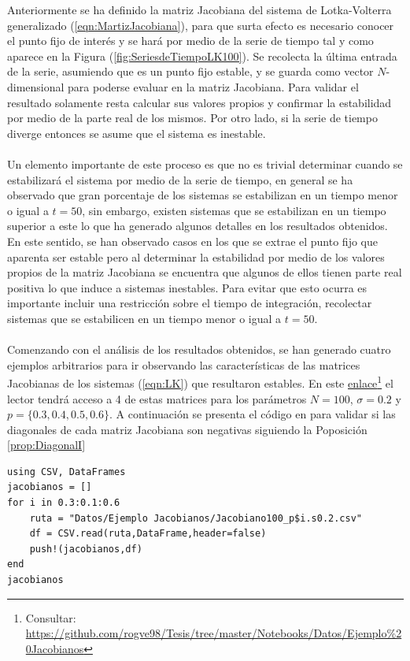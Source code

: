 Anteriormente se ha definido la matriz Jacobiana del sistema de Lotka-Volterra generalizado (\ref{eqn:MartizJacobiana}), para que surta efecto es necesario conocer el punto fijo de interés y se hará por medio de la serie de tiempo tal y como aparece en la Figura (\ref{fig:SeriesdeTiempoLK100}). Se recolecta la última entrada de la serie, asumiendo que es un punto fijo estable, y se guarda como vector $N$-dimensional para poderse evaluar en la matriz Jacobiana. Para validar el resultado solamente resta calcular sus valores propios y confirmar la estabilidad por medio de la parte real de los mismos. Por otro lado, si la serie de tiempo diverge entonces se asume que el sistema es inestable.
\\
\\
Un elemento importante de este proceso es que no es trivial determinar cuando se estabilizará el sistema por medio de la serie de tiempo, en general se ha observado que gran porcentaje de los sistemas se estabilizan en un tiempo menor o igual a $t=50$, sin embargo, existen sistemas que se estabilizan en un tiempo superior a este lo que ha generado algunos detalles en los resultados obtenidos. En este sentido, se han observado casos en los que se extrae el punto fijo que aparenta ser estable pero al determinar la estabilidad por medio de los valores propios de la matriz Jacobiana se encuentra que  algunos de ellos tienen parte real positiva lo que induce a sistemas inestables. Para evitar que esto ocurra es importante incluir una restricción sobre el tiempo de integración, recolectar sistemas que se estabilicen en un tiempo menor o igual a $t=50$.
\\
\\
Comenzando con el análisis de los resultados obtenidos, se han generado cuatro ejemplos arbitrarios para ir observando las características de las matrices Jacobianas de los sistemas (\ref{eqn:LK}) que resultaron estables. En este \href{https://github.com/rogve98/Tesis/tree/master/Notebooks/Datos/Ejemplo\%20Jacobianos}{enlace}\footnote{Consultar: \url{https://github.com/rogve98/Tesis/tree/master/Notebooks/Datos/Ejemplo\%20Jacobianos}} el lector tendrá acceso a 4 de estas matrices para los parámetros $N=100$, $\sigma=0.2$ y $p=\{0.3,0.4,0.5,0.6\}$. A continuación se presenta el código en \julia para validar si las diagonales de cada matriz Jacobiana son negativas siguiendo la Poposición \ref{prop:DiagonalI}
\begin{tcolorbox}[colback=green!10!white, colframe=black, title=Entrada]
	\begin{verbatim}
using CSV, DataFrames
jacobianos = []
for i in 0.3:0.1:0.6
    ruta = "Datos/Ejemplo Jacobianos/Jacobiano100_p$i.s0.2.csv"
    df = CSV.read(ruta,DataFrame,header=false)
    push!(jacobianos,df)
end
jacobianos
	\end{verbatim}
\end{tcolorbox}

